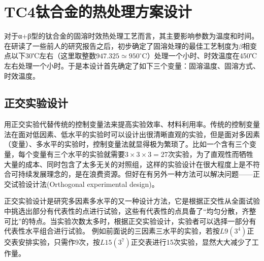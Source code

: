 
\section{TC4钛合金的热处理方案设计}
对于α+β型的\ti 钛合金的固溶时效热处理工艺而言，其主要影响参数为温度和时间。在研读了一些前人的研究报告\cite{mirror1}\cite{ranxingGurongwenduduiTi6Al4VELItaihejinxianweizuzhijixingnengdeyingxiang2021}之后，初步确定了固溶处理的最佳工艺制度为$ \beta $相变点以下30℃左右（这里取整数$ 947.325\simeq950^{\circ} \mathrm{C} $）处理一个小时、时效温度在450℃左右处理一个小时。于是本设计首先确定了如下三个变量：固溶温度、固溶方式、时效温度。
\subsection{正交实验设计}
用正交实验代替传统的控制变量法来提高实验效率、材料利用率。传统的控制变量法在面对低因素、低水平的实验时可以设计出很清晰直观的实验，但是面对多因素（变量）、多水平的实验时，控制变量法就显得极为繁琐了。比如一个含有三个变量，每个变量有三个水平的实验就需要$ 3\times 3 \times 3=27$次实验，为了直观性而牺牲大量的成本、同时包含了太多无关的对照组，这样的实验设计在很大程度上是不符合可持续发展理念的，是在浪费资源。但好在有另外一种方法可以解决问题——正交试验设计法(Orthogonal experimental design)。

正交实验设计是研究多因素多水平的又一种设计方法，它是根据正交性从全面试验中挑选出部分有代表性的点进行试验，这些有代表性的点具备了“均匀分散，齐整可比”的特点\cite{wangxueshen}。当实验次数太多时，根据正交实验设计，实验者可以选择一部分有代表性水平组合进行试验。 例如前面说的三因素三水平的实验，若按$ L9(3^4) $正交表安排实验，只需作9次，按$ L15(3^7) $正交表进行15次实验，显然大大减少了工作量。

